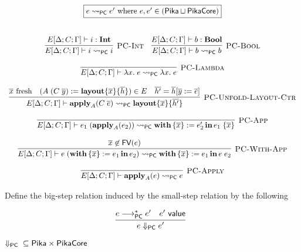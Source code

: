 \[
  \begin{array}{c}
    \fbox{$e \pcNotionStep e'\textrm{ where $e, e' \in (\Pika \sqcup \PikaCore)$}$}
    \fboxNewlines
    \labinfer[PC-Int]{E[\Delta;C;\Gamma] \vdash i \pcNotionStep i}{E[\Delta;C;\Gamma] \vdash i : \Int}
    ~~~
    \labinfer[PC-Bool]{E[\Delta;C;\Gamma] \vdash b \pcNotionStep b}{E[\Delta;C;\Gamma] \vdash b : \Bool}
    \\\\
    \labinfer[PC-Lambda]{E[\Delta;C;\Gamma] \vdash \lambda x.\; e \pcNotionStep \lambda x.\; e}{}
    \\\\
    \labinfer[PC-Unfold-Layout-Ctr]{E[\Delta;C;\Gamma] \vdash \apply_A(C\; \overline{e}) \pcNotionStep \sslmath{\overline{x}}{\overline{h'}}}
      {\fresh{\overline{x}}
      & (A\; (C\; \overline{y}) := \sslmath{\overline{x}}{\overline{h}}) \in E
      & \overline{h'} = \overline{h}[\overline{y} := \overline{e}]
      }
    \\\\
    \labinfer[PC-App]{E[\Delta;C;\Gamma] \vdash e_1\;(\apply_A(e_2)) \pcNotionStep \withIn{\{ \overline{x} \} := e_2'} e_1\; \{\overline{x}\}}
      {}
    \\\\
    \labinfer[PC-With-App]{E[\Delta;C;\Gamma] \vdash e\; (\withIn{\{ \overline{x} \} := e_1} e_2) \pcNotionStep \withIn{\{ \overline{x} \} := e_1} e\; e_2}
      {\overline{x} \not\in \FV(e)}
    \\\\
    \labinfer[PC-Apply]{E[\Delta;C;\Gamma] \vdash \apply_A(e) \pcNotionStep e}
      {}
  \end{array}
\]

Define the big-step relation induced by the small-step relation by the following

\[
  \begin{array}{c}
    \labinfer{e \pcStep e'}
      {e \pcsteps e' & e' ~\val}
  \end{array}
\]

\begin{theorem} $\Downarrow_{\textsf{PC}}{} \subseteq \textsf{Pika} \times \textsf{PikaCore}$
\end{theorem}

